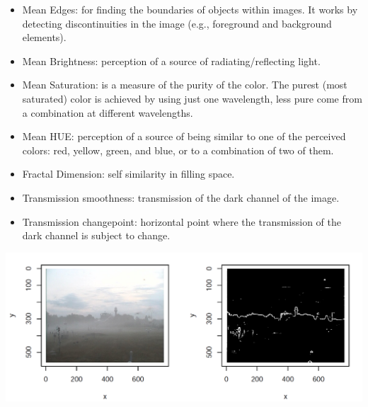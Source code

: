 \documentclass{article}
\begin{document}
\begin{tcolorbox}[colback=red!5!white,colframe=red!75!black,title=Image Features]
\begin{itemize}
\item{Mean Edges: for finding the boundaries of objects within images. 
It works by detecting discontinuities in the image (e.g., foreground and background elements).
}
\item{Mean Brightness: perception of a source of radiating/reflecting light.}
\item{Mean Saturation: is a measure of the purity of the color. 
The purest (most saturated) color is achieved by using just one wavelength, less pure come from a combination at different wavelengths.
}
\item{Mean HUE: perception of a source of being similar to one of the perceived colors: red, yellow, green, and blue, or to a combination of two of them.}
\item{Fractal Dimension: self similarity in filling space.}
\item{Transmission smoothness: transmission of the dark channel of the image.}
\item{Transmission changepoint: horizontal point where the transmission of the dark channel is subject to change.}
\end{itemize}
\end{tcolorbox}


\begin{minipage}[b]{\columnwidth}
	\begin{center}
	\includegraphics[width=0.95\columnwidth]{edges}
	\label{figEdges}
	\end{center}
\end{minipage}
\end{document}
